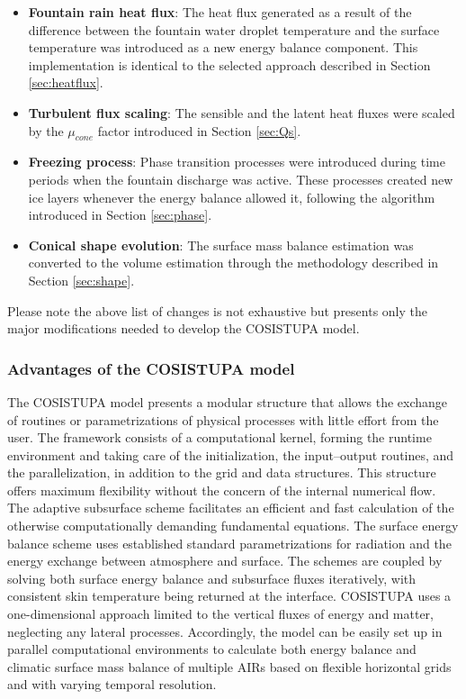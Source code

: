 \begin{itemize}

	\item \textbf{Fountain rain heat flux}: The heat flux generated as a result of the difference between the fountain water droplet
	      temperature and the surface temperature was introduced as a new energy balance component. This implementation is
	      identical to the selected approach described in Section \ref{sec:heatflux}.

	\item \textbf{Turbulent flux scaling}: The sensible and the latent heat fluxes were scaled by the $\mu_{cone}$ factor
	      introduced in Section \ref{sec:Qs}.

	\item \textbf{Freezing process}: Phase transition processes were introduced during time periods when the fountain
	      discharge was active. These processes created new ice layers whenever the energy balance allowed it,
	      following the algorithm introduced in Section \ref{sec:phase}.

	\item \textbf{Conical shape evolution}: The surface mass balance estimation was converted to the volume estimation
	      through the methodology described in Section \ref{sec:shape}.

\end{itemize}

Please note the above list of changes is not exhaustive but presents only the major modifications needed to
develop the COSISTUPA model.

\subsubsection{Advantages of the COSISTUPA model}

The COSISTUPA model presents a modular structure that allows the exchange of routines or parametrizations of physical
processes with little effort from the user. The framework consists of a computational kernel, forming
the runtime environment and taking care of the initialization, the input–output routines, and the
parallelization, in addition to the grid and data structures. This structure offers maximum flexibility without
the concern of the internal numerical flow. The adaptive subsurface scheme facilitates an efficient and fast
calculation of the otherwise computationally demanding fundamental equations. The surface energy balance scheme
uses established standard parametrizations for radiation and the energy exchange between atmosphere and surface. The schemes are coupled by solving both surface energy balance and subsurface fluxes
iteratively, with consistent skin temperature being returned at the interface. COSISTUPA uses a one-dimensional
approach limited to the vertical fluxes of energy and matter, neglecting any lateral processes. Accordingly,
the model can be easily set up in parallel computational environments to calculate both energy balance and
climatic surface mass balance of multiple \ac{AIRs} based on flexible horizontal grids and with varying temporal
resolution.

